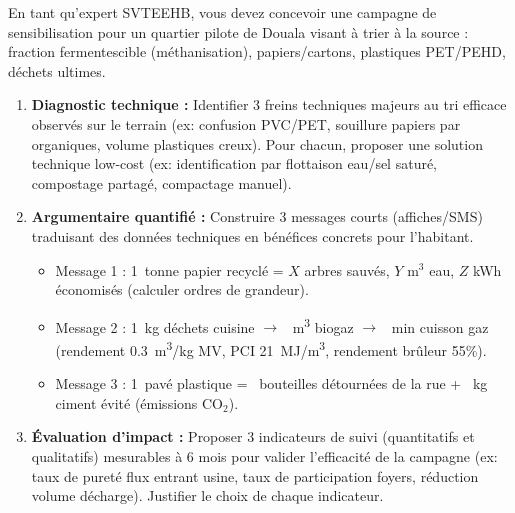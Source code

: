 \documentclass[11pt]{article}
\begin{document}
\begin{exercice}
En tant qu'expert SVTEEHB, vous devez concevoir une campagne de sensibilisation pour un quartier pilote de Douala visant à trier à la source : fraction fermentescible (méthanisation), papiers/cartons, plastiques PET/PEHD, déchets ultimes.
\begin{enumerate}
    \item \textbf{Diagnostic technique :} Identifier 3 freins techniques majeurs au tri efficace observés sur le terrain (ex: confusion PVC/PET, souillure papiers par organiques, volume plastiques creux). Pour chacun, proposer une solution technique low-cost (ex: identification par flottaison eau/sel saturé, compostage partagé, compactage manuel).
    \item \textbf{Argumentaire quantifié :} Construire 3 messages courts (affiches/SMS) traduisant des données techniques en bénéfices concrets pour l'habitant.
    \begin{itemize}
        \item Message 1 : \SI{1}{tonne} papier recyclé = $X$ arbres sauvés, $Y$ m$^3$ eau, $Z$ kWh économisés (calculer ordres de grandeur).
        \item Message 2 : \SI{1}{kg} déchets cuisine $\rightarrow$ \SI{}{m^3} biogaz $\rightarrow$ \SI{}{min} cuisson gaz (rendement \SI{0,3}{m^3/kg} MV, PCI \SI{21}{MJ/m^3}, rendement brûleur 55\%).
        \item Message 3 : \SI{1}{pavé} plastique = \SI{}{bouteilles} détournées de la rue + \SI{}{kg} ciment évité (émissions CO$_2$).
    \end{itemize}
    \item \textbf{Évaluation d'impact :} Proposer 3 indicateurs de suivi (quantitatifs et qualitatifs) mesurables à 6 mois pour valider l'efficacité de la campagne (ex: taux de pureté flux entrant usine, taux de participation foyers, réduction volume décharge). Justifier le choix de chaque indicateur.
\end{enumerate}
\end{exercice}
\end{document}
